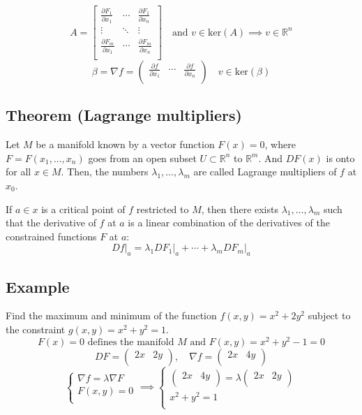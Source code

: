 \documentclass[11pt]{article}
\begin{document}
\[
A = \begin{bmatrix}
    \frac{\partial F_1}{\partial x_1} & \cdots & \frac{\partial F_1}{\partial x_n} \\
    \vdots & \ddots & \vdots \\
    \frac{\partial F_m}{\partial x_1} & \cdots & \frac{\partial F_m}{\partial x_n} \\
\end{bmatrix} \quad \text{and } v \in \text{ker}(A) \implies v \in \mathbb{R}^n
\]
\[
\beta = \nabla f = \begin{pmatrix}
    \frac{\partial f}{\partial x_1} & \cdots & \frac{\partial f}{\partial x_n} \\
\end{pmatrix} \quad v \in \text{ker}(\beta)
\]

\subsection{Theorem (Lagrange multipliers)}
Let $M$ be a manifold known by a vector function $F(x) = 0$, where $F = F(x_1, \ldots, x_n)$ goes from an open subset $U \subset \mathbb{R}^n$ to $\mathbb{R}^m$. And $DF(x)$ is onto for all $x \in M$. Then, the numbers $\lambda_1, \ldots, \lambda_m$ are called Lagrange multipliers of $f$ at $x_0$. 

If $a \in x$ is a critical point of $f$ restricted to $M$, then there exists $\lambda_1, \ldots, \lambda_m$ such that the derivative of $f$ at $a$ is a linear combination of the derivatives of the constrained functions $F$ at $a$:
\[
Df\big|_a = \lambda_1 DF_1\big|_a + \cdots + \lambda_m DF_m\big|_a
\]

\subsection*{Example}
Find the maximum and minimum of the function $f(x,y) = x^2 + 2y^2$ subject to the constraint $g(x,y) = x^2 + y^2 = 1$.
\[
F(x) = 0 \text{ defines the manifold } M \text{ and } F(x,y) = x^2 + y^2 - 1 = 0
\]
\[
DF = \begin{pmatrix}
    2x & 2y \\
\end{pmatrix}, \quad \nabla f = \begin{pmatrix}
    2x & 4y \\
\end{pmatrix}
\]
\[
\begin{cases}
    \nabla f = \lambda \nabla F \\
    F(x,y) = 0 \\
\end{cases} \implies \begin{cases}
    \begin{pmatrix}
        2x & 4y \\
    \end{pmatrix} = \lambda \begin{pmatrix}
        2x & 2y \\
    \end{pmatrix} \\
    x^2 + y^2 = 1 \\
\end{cases}
\]
\end{document}
